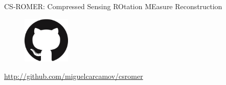 \documentclass[xetex,aspectratio=169]{beamer}
\begin{document}
%


\begin{frame}{CS-ROMER: Compressed Sensing ROtation MEasure Reconstruction}
	\begin{figure}
		\centering
		\includegraphics[width=0.2\textwidth]{figures/logos/GitHub-Mark-120px-plus.png}
	\end{figure}

	\begin{center}
		\url{http://github.com/miguelcarcamov/csromer}
	\end{center}


\end{frame}
\end{document}
